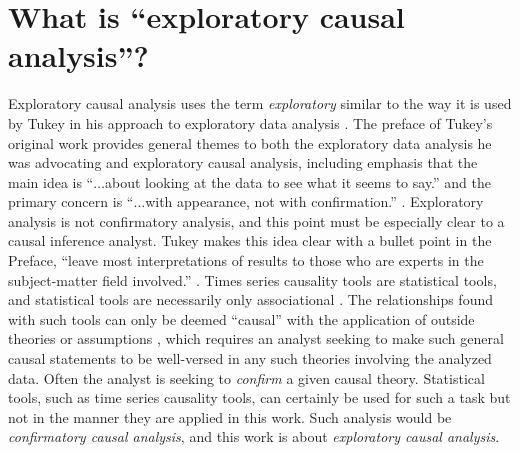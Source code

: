 \section{What is ``exploratory causal analysis''?}
\label{sec:whatisECA}
Exploratory causal analysis uses the term {\em exploratory} similar to the way it is used by Tukey in his approach to exploratory data analysis \cite{Tukey1977}.  The preface of Tukey's original work provides general themes to both the exploratory data analysis he was advocating and exploratory causal analysis, including emphasis that the main idea is ``$\ldots$about looking at the data to see what it seems to say.'' and the primary concern is ``$\ldots$with appearance, not with confirmation.'' \cite{Tukey1977}.  Exploratory analysis is not confirmatory analysis, and this point must be especially clear to a causal inference analyst.  Tukey makes this idea clear with a bullet point in the Preface, ``leave most interpretations of results to those who are experts in the subject-matter field involved.'' \cite{Tukey1977}.  Times series causality tools are statistical tools, and statistical tools are necessarily only associational \cite{Illari2014}.  The relationships found with such tools can only be deemed ``causal'' with the application of outside theories or assumptions \cite{Illari2014}, which requires an analyst seeking to make such general causal statements to be well-versed in any such theories involving the analyzed data.  Often the analyst is seeking to {\em confirm} a given causal theory.  Statistical tools, such as time series causality tools, can certainly be used for such a task but not in the manner they are applied in this work.  Such analysis would be {\em confirmatory causal analysis}, and this work is about {\em exploratory causal analysis}.  

